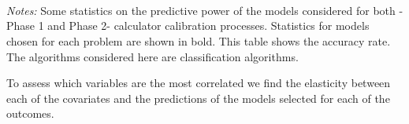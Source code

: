  \begin{table}[H]
     \caption{Fit assessment of discrete calculator models}
     \label{ml_models_comparison_disc}
 \begin{subtable}{0.85\textwidth}
     \caption*{Phase 1: Discrete outcomes}
     \raggedleft
     \scriptsize{}
 \end{subtable}%
   
     \bigskip
 \begin{subtable}{1\textwidth}
       \centering
         \caption*{Phases 2 and 3: Discrete outcomes}
         \scriptsize{}
 \end{subtable}
 \\
 \\
 \\
 \scriptsize
   \textit{Notes:} Some statistics on the predictive power of the models considered for both -Phase 1 and Phase 2- calculator calibration processes. Statistics for models chosen for each problem are shown in bold. This table shows the accuracy rate. The algorithms considered here are classification algorithms.
 \end{table}

To assess which variables are the most correlated we find the elasticity between each of the covariates and the predictions of the models selected for each of the outcomes. 


